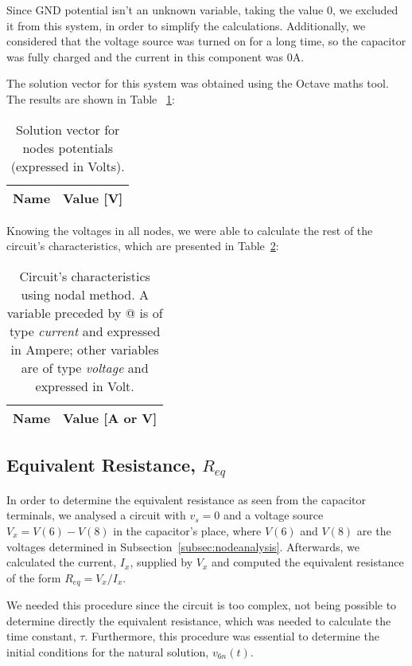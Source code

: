 Since GND potential isn't an unknown variable, taking the value 0, we excluded it from this system, in order to simplify the calculations. Additionally, we considered that the voltage source was turned on for a long time, so the capacitor was fully charged and the current in this component was $0$A.

The solution vector for this system was obtained using the Octave maths tool. The results are shown in Table ~\ref{tab:node1}:

\begin{table}[H]
  \centering
  \begin{tabular}{|l|r|}
    \hline    
    {\bf Name} & {\bf Value [V]} \\ \hline
    
  \end{tabular}
  \caption{Solution vector for nodes potentials (expressed in Volts).}
  \label{tab:node1}
\end{table}

Knowing the voltages in all nodes, we were able to calculate the rest of the circuit's characteristics, which are presented in Table~\ref{tab:nodetab1}:

\begin{table}[H]
  \centering
  \begin{tabular}{|l|r|}
    \hline    
    {\bf Name} & {\bf Value [A or V]} \\ \hline
    
  \end{tabular}
  \caption{Circuit's characteristics using nodal method. A variable preceded by @ is of type {\em current}
    and expressed in Ampere; other variables are of type {\it voltage} and expressed in
    Volt.}
  \label{tab:nodetab1}
\end{table}

\subsection{Equivalent Resistance, $R_{eq}$}
\label{subsec:eqresist}

In order to determine the equivalent resistance as seen from the capacitor terminals, we analysed a circuit with $v_s=0$ and a voltage source $V_x = V(6)-V(8)$ in the capacitor's place, where $V(6)$ and $V(8)$ are the voltages determined in Subsection~\ref{subsec:nodeanalysis}. Afterwards, we calculated the current, $I_x$, supplied by $V_x$ and computed the equivalent resistance of the form $R_{eq}=V_x/I_x$.

We needed this procedure since the circuit is too complex, not being possible to determine directly the equivalent resistance, which was needed to calculate the time constant, $\tau$. Furthermore, this procedure was essential to determine the initial conditions for the natural solution, $v_{6n}(t)$.

